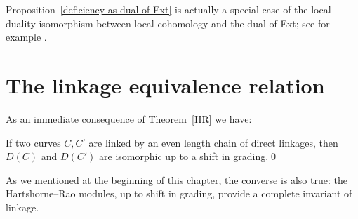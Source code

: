 Proposition~\ref{deficiency as dual of Ext} is actually a special case
of the local duality isomorphism between local cohomology and the dual
of Ext; see for example \cite[Theorem A.1.9]{MR2103875}.

\section{The linkage equivalence relation}
As an immediate consequence of Theorem~\ref{HR} we have:

\begin{corollary}[Hartshorne]
If two curves $C,C'$ are linked by an even length chain of direct
linkages, then
$D(C)$ and $D(C')$ are isomorphic up to a shift in grading.\qed
\unif
\end{corollary}

As we mentioned at the beginning of this chapter, the converse is also
true: the
Hartshorne--Rao modules,
%
up to shift in grading, provide a
complete invariant of linkage. 

